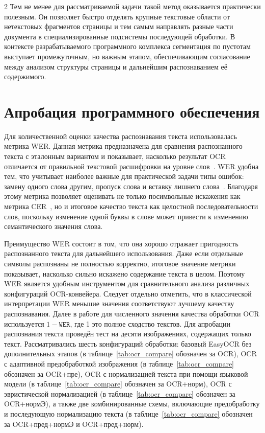\documentclass[11pt]{article}
\begin{document}
\begin{multicols}{2}
Тем не менее для рассматриваемой задачи такой метод оказывается практически полезным. Он позволяет быстро отделять крупные текстовые области от нетекстовых фрагментов страницы и тем самым направлять разные части документа в специализированные подсистемы последующей обработки. В контексте разрабатываемого программного комплекса сегментация по пустотам выступает промежуточным, но важным этапом, обеспечивающим согласование между анализом структуры страницы и дальнейшим распознаванием её содержимого. 
\section{Апробация программного обеспечения}


Для количественной оценки качества распознавания текста использовалась метрика WER. Данная метрика предназначена для сравнения распознанного текста с эталонным вариантом и показывает, насколько результат OCR отличается от правильной текстовой расшифровки на уровне слов~\cite{refOCRMetrics}. WER удобна тем, что учитывает наиболее важные для практической задачи типы ошибок: замену одного слова другим, пропуск слова и вставку лишнего слова~\cite{refOCRMetrics}. Благодаря этому метрика позволяет оценивать не только посимвольные искажения как метрика CER~\cite{refOCRMetrics}, но и итоговое качество текста как целостной последовательности слов, поскольку изменение одной буквы в слове может привести к изменению семантического значения слова.

Преимущество WER состоит в том, что она хорошо отражает пригодность распознанного текста для дальнейшего использования. Даже если отдельные символы распознаны не полностью корректно, итоговое значение метрики показывает, насколько сильно искажено содержание текста в целом. Поэтому WER является удобным инструментом для сравнительного анализа различных конфигураций OCR-конвейера. Следует отдельно отметить, что в классической интерпретации WER меньшие значения соответствуют лучшему качеству распознавания. Далее в работе для численного значения качества обработки OCR используется $1-\mathtt{WER}$, где 1 это полное сходство текстов.  
Для апробации распознания текста проведён тест на десяти изображениях, содержащих только текст. Рассматривались шесть конфигураций обработки: базовый EasyOCR без дополнительных этапов (в таблице~\ref{tab:ocr_compare} обозначен за OCR), OCR с адаптивной предобработкой изображения (в таблице~\ref{tab:ocr_compare} обозначен за OCR+пре), OCR с нормализацией текста при помощи языковой модели (в таблице~\ref{tab:ocr_compare} обозначен за OCR+норм), OCR с эвристической нормализацией (в таблице~\ref{tab:ocr_compare} обозначен за OCR+нормЭ), а также две комбинированные схемы, включающие предобработку и последующую нормализацию текста (в таблице~\ref{tab:ocr_compare} обозначен за OCR+пред+нормЭ и OCR+пред+норм).


\end{multicols}
\end{document}
